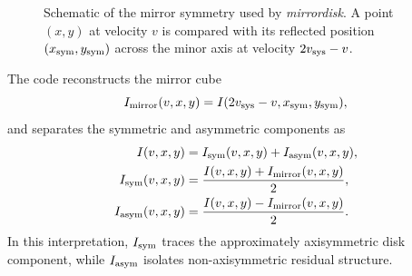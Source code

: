 \documentclass{report}
\begin{document}
\begin{figure}[t]
\centering
{}
\caption{Schematic of the mirror symmetry used by \textit{mirrordisk}. A point $(x,y)$ at velocity $v$ is compared with its reflected position $(x_{\rm sym}, y_{\rm sym})$ across the minor axis at velocity $2v_{\rm sys}-v$.}
\label{fig:mirror_symmetry}
\end{figure}

The code reconstructs the mirror cube
\begin{equation}
    I_{\rm mirror}(v, x, y) = I(2v_{\rm sys} - v, x_{\rm sym}, y_{\rm sym}),
\end{equation}
and separates the symmetric and asymmetric components as
\begin{align}
     I(v, x, y) &= I_{\rm sym}(v, x, y) + I_{\rm asym}(v, x, y), \\
I_{\rm sym}(v, x, y) &= \frac{I(v, x, y) + I_{\rm mirror}(v, x, y)}{2}, \\
I_{\rm asym}(v, x, y) &= \frac{I(v, x, y) - I_{\rm mirror}(v, x, y)}{2}.
\end{align}
In this interpretation, $I_{\rm sym}$ traces the approximately axisymmetric disk component, while $I_{\rm asym}$ isolates non-axisymmetric residual structure.
\end{document}
